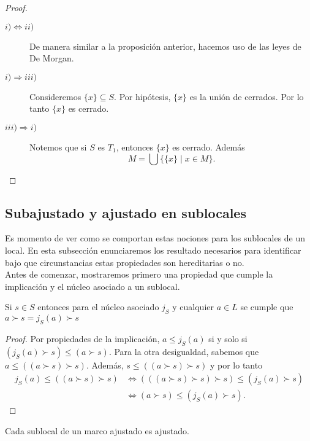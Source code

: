 \begin{proof}
    \begin{description}
        \item[$i)\Leftrightarrow ii)$] De manera similar a la proposición anterior, hacemos uso de las leyes de De Morgan. 
        \item[$i)\Rightarrow iii)$] Consideremos $\{x\}\subseteq S$. Por hipótesis, $\{x\}$ es la unión de cerrados. Por lo tanto $\{x\}$ es cerrado.
        \item[$iii)\Rightarrow i)$] Notemos que si $S$ es $T_1$, entonces $\{x\}$ es cerrado. Además 
        \[
        M=\bigcup\{\{x\}\mid x\in M\}. 
        \]
    \end{description}
\end{proof}

\subsection{Subajustado y ajustado en sublocales}\label{Sajuyaju en Sublocales}

Es momento de ver como se comportan estas nociones para los sublocales de un local. En esta subsección enunciaremos los resultado necesarios para identificar bajo que circunstancias estas propiedades son hereditarias o no.\\

Antes de comenzar, mostraremos primero una propiedad que cumple la implicación y el núcleo asociado a un sublocal. 

\begin{prop}\label{nucleoimplicacion}
    Si $s\in S$ entonces para el núcleo asociado $j_S$ y cualquier $a\in L$ se cumple que $a\succ s=j_S(a)\succ s$
\end{prop}

\begin{proof}
    Por propiedades de la implicación, $a\leq j_S(a)$ si y solo si $(j_S(a)\succ s)\leq (a\succ s)$. Para la otra desigualdad, sabemos que $a\leq ((a\succ s)\succ s)$. Además, $s\leq ((a\succ s)\succ s)$ y por lo tanto  
    \[
    \begin{split}
    j_S(a)\leq ((a\succ s)\succ s) & \Leftrightarrow (((a\succ s)\succ s)\succ s)\leq (j_S(a)\succ s)\\ & \Leftrightarrow (a\succ s)\leq (j_S(a)\succ s).
    \end{split}
    \]
\end{proof}

\begin{prop}\label{aju aju}
    Cada sublocal de un marco ajustado es ajustado.
\end{prop}


